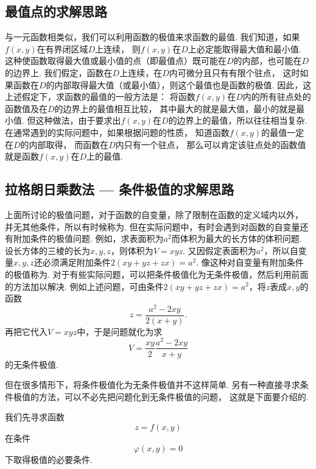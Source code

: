 \subsection{最值点的求解思路}
与一元函数相类似，我们可以利用函数的极值来求函数的最值.
我们知道，如果\(f(x,y)\)在有界闭区域\(D\)上连续，
则\(f(x,y)\)在\(D\)上必定能取得最大值和最小值.
这种使函数取得最大值或最小值的点（即最值点）既可能在\(D\)的内部，也可能在\(D\)的边界上.
我们假定，函数在\(D\)上连续，在\(D\)内可微分且只有有限个驻点，
这时如果函数在\(D\)的内部取得最大值（或最小值），则这个最值也是函数的极值.
因此，这上述假定下，求函数的最值的一般方法是：
将函数\(f(x,y)\)在\(D\)内的所有驻点处的函数值及在\(D\)的边界上的最值相互比较，
其中最大的就是最大值，最小的就是最小值.
但这种做法，由于要求出\(f(x,y)\)在\(D\)的边界上的最值，所以往往相当复杂.
在通常遇到的实际问题中，如果根据问题的性质，
知道函数\(f(x,y)\)的最值一定在\(D\)的内部取得，
而函数在\(D\)内只有一个驻点，
那么可以肯定该驻点处的函数值就是函数\(f(x,y)\)在\(D\)上的最值.

\subsection{拉格朗日乘数法 --- 条件极值的求解思路}\label{subsection:多元函数微分法.拉格朗日乘数法}
上面所讨论的极值问题，对于函数的自变量，除了限制在函数的定义域内以外，
并无其他条件，所以有时候称为.
但在实际问题中，有时会遇到对函数的自变量还有附加条件的极值问题.
例如，求表面积为\(a^2\)而体积为最大的长方体的体积问题.
设长方体的三棱的长为\(x,y,z\)，则体积为\(V = xyz\).
又因假定表面积为\(a^2\)，所以自变量\(x,y,z\)还必须满足附加条件\(2(xy+yz+zx)=a^2\).
像这种对自变量有附加条件的极值称为.
对于有些实际问题，可以把条件极值化为无条件极值，然后利用前面的方法加以解决.
例如上述问题，可由条件\(2(xy+yz+zx)=a^2\)，将\(z\)表成\(x,y\)的函数\[
	z = \frac{a^2-2xy}{2(x+y)}.
\]
再把它代入\(V = xyz\)中，于是问题就化为求\[
	V = \frac{xy}{2} \frac{a^2-2xy}{x+y}
\]的无条件极值.

但在很多情形下，将条件极值化为无条件极值并不这样简单.
另有一种直接寻求条件极值的方法，可以不必先把问题化到无条件极值的问题，
这就是下面要介绍的.

我们先寻求函数
\begin{equation}\label{equation:拉格朗日乘数法.目标函数1}
	z=f(x,y)
\end{equation}
在条件
\begin{equation}\label{equation:拉格朗日乘数法.限制条件1}
	\varphi(x,y)=0
\end{equation}
下取得极值的必要条件.

